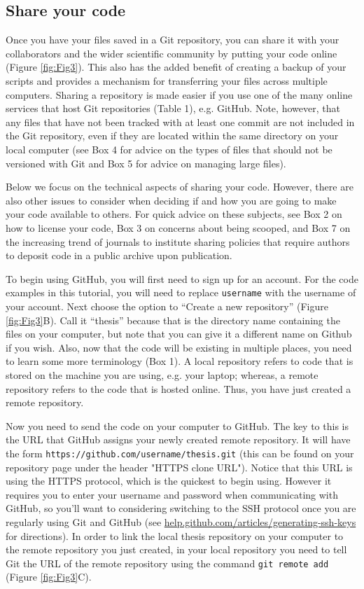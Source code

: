 \subsection{Share your code}

Once you have your files saved in a Git repository, you can share it with your collaborators and the wider scientific community by putting your code online (Figure \ref{fig:Fig3}).
This also has the added benefit of creating a backup of your scripts and provides a mechanism for transferring your files across multiple computers.
Sharing a repository is made easier if you use one of the many online services that host Git repositories (Table 1), e.g. GitHub.
Note, however, that any files that have not been tracked with at least one commit are not included in the Git repository, even if they are located within the same directory on your local computer (see Box 4 for advice on the types of files that should not be versioned with Git and Box 5 for advice on managing large files).

Below we focus on the technical aspects of sharing your code.
However, there are also other issues to consider when deciding if and how you are going to make your code available to others.
For quick advice on these subjects, see Box 2 on how to license your code, Box 3 on concerns about being scooped, and Box 7 on the increasing trend of journals to institute sharing policies that require authors to deposit code in a public archive upon publication.

To begin using GitHub, you will first need to sign up for an account.
For the code examples in this tutorial, you will need to replace \verb|username| with the username of your account.
Next choose the option to ``Create a new repository'' (Figure \ref{fig:Fig3}B).
Call it ``thesis'' because that is the directory name containing the files on your computer, but note that you can give it a different name on Github if you wish.
Also, now that the code will be existing in multiple places, you need to learn some more terminology (Box 1).
A local repository refers to code that is stored on the machine you are using, e.g. your laptop; whereas, a remote repository refers to the code that is hosted online.
Thus, you have just created a remote repository.

Now you need to send the code on your computer to GitHub.
The key to this is the URL that GitHub assigns your newly created remote repository.
It will have the form \verb|https://github.com/username/thesis.git| (this can be found on your repository page under the header "HTTPS clone URL").
Notice that this URL is using the HTTPS protocol, which is the quickest to begin using.
However it requires you to enter your username and password when communicating with GitHub, so you'll want to considering switching to the SSH protocol once you are regularly using Git and GitHub (see \href{https://help.github.com/articles/generating-ssh-keys/}{help.github.com/articles/generating-ssh-keys} for directions).
In order to link the local thesis repository on your computer to the remote repository you just created, in your local repository you need to tell Git the URL of the remote repository using the command \verb|git remote add| (Figure \ref{fig:Fig3}C).


